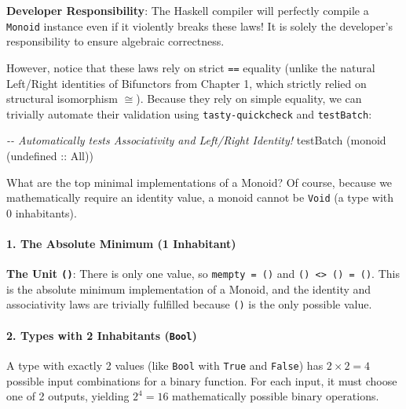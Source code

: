 \documentclass[
]{article}
\newenvironment{Shaded}{}{}
\newcommand{\CommentTok}[1]{\textcolor[rgb]{0.38,0.63,0.69}{\textit{#1}}}
\newcommand{\DataTypeTok}[1]{\textcolor[rgb]{0.56,0.13,0.00}{#1}}
\newcommand{\FunctionTok}[1]{\textcolor[rgb]{0.02,0.16,0.49}{#1}}
\newcommand{\NormalTok}[1]{#1}
\newcommand{\OtherTok}[1]{\textcolor[rgb]{0.00,0.44,0.13}{#1}}
\begin{document}
\textbf{Developer Responsibility}: The Haskell compiler will perfectly
compile a \texttt{Monoid} instance even if it violently breaks these
laws! It is solely the developer's responsibility to ensure algebraic
correctness.

However, notice that these laws rely on strict \texttt{==} equality
(unlike the natural Left/Right identities of Bifunctors from Chapter 1,
which strictly relied on structural isomorphism \(\cong\)). Because they
rely on simple equality, we can trivially automate their validation
using \texttt{tasty-quickcheck} and \texttt{testBatch}:

\begin{Shaded}
\begin{Highlighting}[]
\CommentTok{{-}{-} Automatically tests Associativity and Left/Right Identity!}
\NormalTok{testBatch (monoid (}\FunctionTok{undefined}\OtherTok{ ::} \DataTypeTok{All}\NormalTok{))}
\end{Highlighting}
\end{Shaded}

What are the top minimal implementations of a Monoid? Of course, because
we mathematically require an identity value, a monoid cannot be
\texttt{Void} (a type with 0 inhabitants).

\paragraph{1. The Absolute Minimum (1
Inhabitant)}\label{the-absolute-minimum-1-inhabitant}

\textbf{The Unit \texttt{()}}: There is only one value, so
\texttt{mempty\ =\ ()} and
\texttt{()\ \textless{}\textgreater{}\ ()\ =\ ()}. This is the absolute
minimum implementation of a Monoid, and the identity and associativity
laws are trivially fulfilled because \texttt{()} is the only possible
value.

\paragraph{\texorpdfstring{2. Types with 2 Inhabitants
(\texttt{Bool})}{2. Types with 2 Inhabitants (Bool)}}\label{types-with-2-inhabitants-bool}

A type with exactly 2 values (like \texttt{Bool} with \texttt{True} and
\texttt{False}) has \(2 \times 2 = 4\) possible input combinations for a
binary function. For each input, it must choose one of 2 outputs,
yielding \(2^4 = 16\) mathematically possible binary operations.
\end{document}
